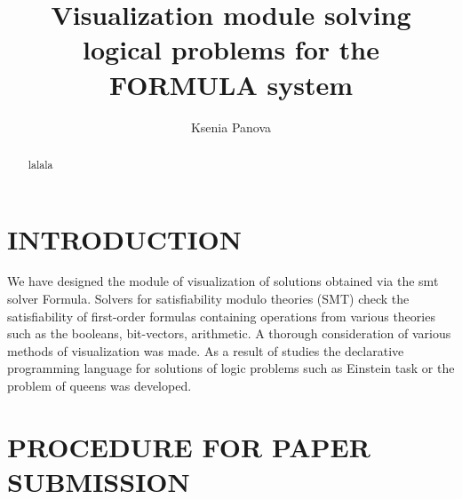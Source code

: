 \documentclass[a4paper, 10pt, conference]{ieeeconf}
\title{\LARGE \bf
Visualization module solving logical problems for the FORMULA system
}
\author{Ksenia Panova%
}
\begin{document}
\maketitle
\thispagestyle{empty}
\pagestyle{empty}


\begin{abstract}

lalala

\end{abstract}


\section{INTRODUCTION}

We have designed the module of visualization of solutions obtained via the smt solver Formula. Solvers for satisfiability modulo theories (SMT) check the satisfiability of first-order formulas containing operations from various theories such as the booleans, bit-vectors, arithmetic. A thorough consideration of various methods of visualization was made. As a result of studies the declarative programming language for solutions of logic problems such as Einstein task or the problem of queens was developed.

\section{PROCEDURE FOR PAPER SUBMISSION}
\end{document}
